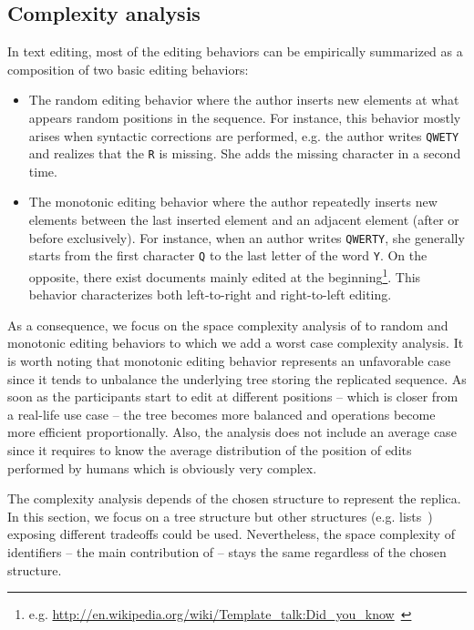 \subsection{Complexity analysis}
\label{subsec:complexity}

In text editing, most of the editing behaviors can be empirically summarized as
a composition of two basic editing behaviors:
\begin{itemize}[noitemsep, leftmargin=*]
\item The random editing behavior where the author inserts new elements at what
  appears random positions in the sequence. For instance, this behavior mostly
  arises when syntactic corrections are performed, e.g. the author writes
  \texttt{QWETY} and realizes that the \texttt{R} is missing. She adds the
  missing character in a second time.
\item The monotonic editing behavior where the author repeatedly inserts new
  elements between the last inserted element and an adjacent element (after or
  before exclusively). For instance, when an author writes \texttt{QWERTY}, she
  generally starts from the first character \texttt{Q} to the last letter of the
  word \texttt{Y}. On the opposite, there exist documents mainly edited at the
  beginning\footnote{e.g. \url{http://en.wikipedia.org/wiki/Template_talk:Did_you_know}~\cite{nedelec2013lseq}}. This
  behavior characterizes both left-to-right and right-to-left editing.
\end{itemize}

\noindent As a consequence, we focus on the space complexity analysis of \LSEQ
to random and monotonic editing behaviors to which we add a worst case
complexity analysis. It is worth noting that monotonic editing behavior
represents an unfavorable case since it tends to unbalance the underlying tree
storing the replicated sequence. As soon as the participants start to edit at
different positions -- which is closer from a real-life use case -- the tree
becomes more balanced and operations become more efficient proportionally. Also,
the analysis does not include an average case since it requires to know the
average distribution of the position of edits performed by humans which is
obviously very complex.

The complexity analysis depends of the chosen structure to represent the
replica. In this section, we focus on a tree structure but other structures
(e.g. lists~\cite{weiss2009logoot}) exposing different tradeoffs could be
used. Nevertheless, the space complexity of identifiers -- the main contribution
of \LSEQ -- stays the same regardless of the chosen structure.

